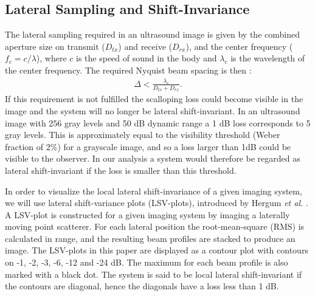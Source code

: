 \documentclass[journal]{IEEEtran}
\newcommand{\mat}[1]{\mathbf{#1}}
\renewcommand{\vec}[1]{\mathbf{#1}}
\begin{document}

\subsection{Lateral Sampling and Shift-Invariance}

The lateral sampling required in an ultrasound image is given by the combined aperture size on transmit ($D_{tx}$) and receive ($D_{rx}$), and the center frequency ($f_c = c/\lambda$), where $c$ is the speed of sound in the body and $\lambda_c$ is the wavelength of the center frequency. The required Nyquist beam spacing is then \cite{Hergum2007}:
\begin{align}
\Delta < \frac{\lambda_c}{D_{tx} + D_{rx}}. \label{eq:resolution}
\end{align}
If this requirement is not fulfilled the scalloping loss could become visible in the image and the system will no longer be lateral shift-invariant. In an ultrasound image with 256 gray levels and 50 dB dynamic range a 1 dB loss corresponds to 5 gray levels. This is approximately equal to the visibility threshold (Weber fraction of 2\%) for a grayscale image, and so a loss larger than 1dB could be visible to the observer. In our analysis a system would therefore be regarded as lateral shift-invariant if the loss is smaller than this threshold.

In order to visualize the local lateral shift-invariance of a given imaging system, we will use lateral shift-variance plots (LSV-plots), introduced by Hergum \textit{et al.} \cite{Hergum2007}. A LSV-plot is constructed for a given imaging system by imaging a laterally moving point scatterer. For each lateral position the root-mean-square (RMS) is calculated in range, and the resulting beam profiles are stacked to produce an image. The LSV-plots in this paper are displayed as a contour plot with contours on -1, -2, -3, -6, -12 and -24 dB. The maximum for each beam profile is also marked with a black dot. The system is said to be local lateral shift-invariant if the contours are diagonal, hence the diagonals have a loss less than 1 dB.
\end{document}
